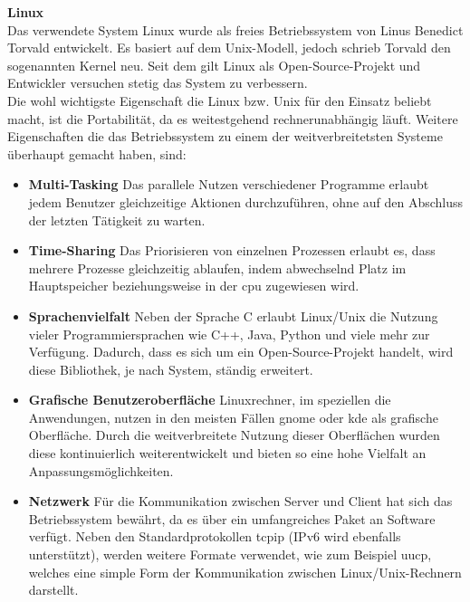 \textbf{Linux}\\
Das verwendete System Linux wurde als freies Betriebssystem von Linus Benedict Torvald entwickelt.
Es basiert auf dem Unix-Modell, jedoch schrieb Torvald den sogenannten Kernel neu. Seit dem gilt
Linux als Open-Source-Projekt und Entwickler versuchen stetig das System zu verbessern.\cite{linux}\\
Die wohl wichtigste Eigenschaft die Linux bzw. Unix für den Einsatz beliebt macht, ist die Portabilität,
da es weitestgehend rechnerunabhängig läuft. Weitere Eigenschaften die das Betriebssystem zu einem der
 weitverbreitetsten Systeme überhaupt gemacht haben, sind:\cite{linux}\\
\begin{itemize}
\item  \textbf{Multi-Tasking} Das parallele Nutzen verschiedener Programme erlaubt jedem Benutzer
        gleichzeitige Aktionen durchzuführen, ohne auf den Abschluss der letzten Tätigkeit zu warten.
\item  \textbf{Time-Sharing} Das Priorisieren von einzelnen Prozessen erlaubt es, dass mehrere
        Prozesse gleichzeitig ablaufen, indem abwechselnd Platz im Hauptspeicher beziehungsweise in der \ac{cpu}
        zugewiesen wird.
\item \textbf{Sprachenvielfalt} Neben der Sprache C erlaubt Linux/Unix die Nutzung vieler Programmiersprachen
      wie C++, Java, Python und viele mehr zur Verfügung. Dadurch, dass es sich um ein Open-Source-Projekt handelt,
      wird diese Bibliothek, je nach System, ständig erweitert.
\item \textbf{Grafische Benutzeroberfläche} Linuxrechner, im speziellen die Anwendungen, nutzen in
      den meisten Fällen \ac{gnome} oder \ac{kde} als grafische Oberfläche. Durch die weitverbreitete Nutzung
      dieser Oberflächen wurden diese kontinuierlich weiterentwickelt und bieten so eine hohe Vielfalt an
      Anpassungsmöglichkeiten.
\item \textbf{Netzwerk} Für die Kommunikation zwischen Server und Client hat sich das Betriebssystem bewährt,
      da es über ein umfangreiches Paket an Software verfügt. Neben den Standardprotokollen \ac{tcpip} (IPv6 wird
      ebenfalls unterstützt), werden weitere Formate verwendet, wie zum Beispiel \ac{uucp}, welches eine simple Form
      der Kommunikation zwischen Linux/Unix-Rechnern darstellt.
\end{itemize}

